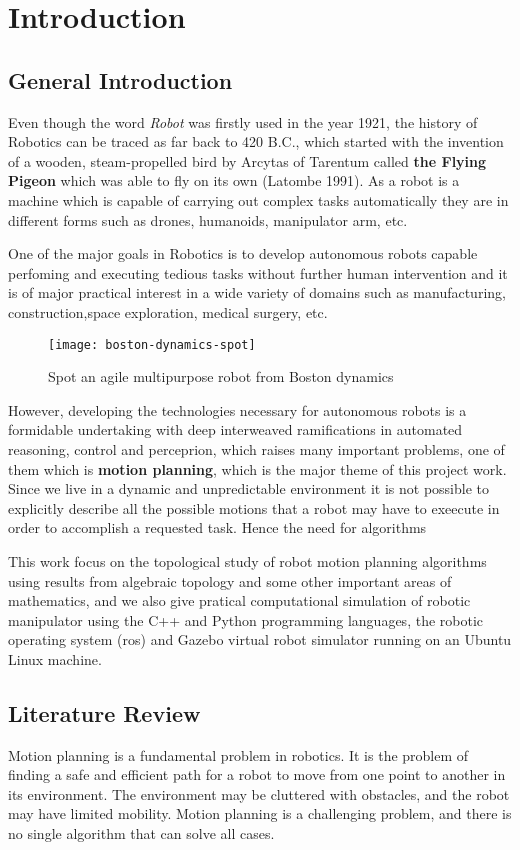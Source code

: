 \chapter{Introduction}
\section{General Introduction}
Even though the word \textit{Robot} was firstly used in the year 1921, the history of Robotics can be traced as far back to 420 B.C., which started with the invention of a wooden, steam-propelled bird by Arcytas of Tarentum called \textbf{the Flying Pigeon} which was able to fly on its own (Latombe 1991).
As a robot is a machine which is capable of carrying out complex tasks automatically they are in different forms such as drones, humanoids, manipulator arm, etc.

One of the major goals in Robotics is to develop autonomous robots capable perfoming and executing tedious tasks without further human intervention and it is of major practical interest in a wide variety of domains such as manufacturing, construction,space exploration, medical surgery, etc.
\begin{figure}[H]
    \centering
    \texttt{[image: boston-dynamics-spot]}
    \caption{Spot an agile multipurpose robot from Boston dynamics} 
\end{figure}
However, developing the technologies necessary for autonomous robots is a formidable undertaking with deep interweaved ramifications in automated reasoning, control and perceprion, which raises many important problems, one of them which is \textbf{motion planning}, which is the major theme of this project work. Since we live in a dynamic and unpredictable environment it is not possible to explicitly describe all the possible motions that a robot may have to exeecute in order to accomplish a requested task. Hence the need for algorithms 

This work focus on the topological study of robot motion planning algorithms using results from algebraic topology and some other important areas of mathematics, and we also give pratical computational simulation of robotic manipulator using the C++ and Python programming languages, the robotic operating system (ros) and Gazebo virtual robot simulator running on an Ubuntu Linux machine.

\section{Literature Review}
Motion planning is a fundamental problem in robotics. It is the problem of finding a safe and efficient path for a robot to move from one point to another in its environment. The environment may be cluttered with obstacles, and the robot may have limited mobility. Motion planning is a challenging problem, and there is no single algorithm that can solve all cases.

